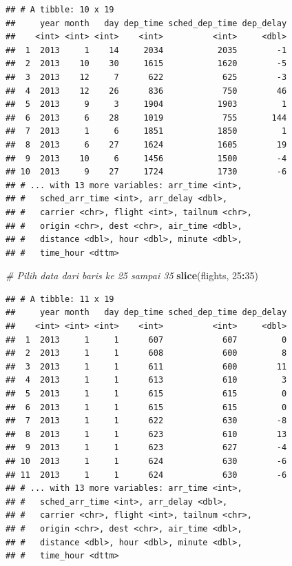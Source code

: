 \documentclass[]{book}
\newenvironment{Shaded}{\begin{snugshade}}{\end{snugshade}}
\newcommand{\KeywordTok}[1]{\textcolor[rgb]{0.13,0.29,0.53}{\textbf{#1}}}
\newcommand{\DecValTok}[1]{\textcolor[rgb]{0.00,0.00,0.81}{#1}}
\newcommand{\CommentTok}[1]{\textcolor[rgb]{0.56,0.35,0.01}{\textit{#1}}}
\newcommand{\OperatorTok}[1]{\textcolor[rgb]{0.81,0.36,0.00}{\textbf{#1}}}
\newcommand{\NormalTok}[1]{#1}
\begin{document}
\begin{verbatim}
## # A tibble: 10 x 19
##     year month   day dep_time sched_dep_time dep_delay
##    <int> <int> <int>    <int>          <int>     <dbl>
##  1  2013     1    14     2034           2035        -1
##  2  2013    10    30     1615           1620        -5
##  3  2013    12     7      622            625        -3
##  4  2013    12    26      836            750        46
##  5  2013     9     3     1904           1903         1
##  6  2013     6    28     1019            755       144
##  7  2013     1     6     1851           1850         1
##  8  2013     6    27     1624           1605        19
##  9  2013    10     6     1456           1500        -4
## 10  2013     9    27     1724           1730        -6
## # ... with 13 more variables: arr_time <int>,
## #   sched_arr_time <int>, arr_delay <dbl>,
## #   carrier <chr>, flight <int>, tailnum <chr>,
## #   origin <chr>, dest <chr>, air_time <dbl>,
## #   distance <dbl>, hour <dbl>, minute <dbl>,
## #   time_hour <dttm>
\end{verbatim}

\begin{Shaded}
\begin{Highlighting}[]
\CommentTok{# Pilih data dari baris ke 25 sampai 35}
\KeywordTok{slice}\NormalTok{(flights, }\DecValTok{25}\OperatorTok{:}\DecValTok{35}\NormalTok{)}
\end{Highlighting}
\end{Shaded}

\begin{verbatim}
## # A tibble: 11 x 19
##     year month   day dep_time sched_dep_time dep_delay
##    <int> <int> <int>    <int>          <int>     <dbl>
##  1  2013     1     1      607            607         0
##  2  2013     1     1      608            600         8
##  3  2013     1     1      611            600        11
##  4  2013     1     1      613            610         3
##  5  2013     1     1      615            615         0
##  6  2013     1     1      615            615         0
##  7  2013     1     1      622            630        -8
##  8  2013     1     1      623            610        13
##  9  2013     1     1      623            627        -4
## 10  2013     1     1      624            630        -6
## 11  2013     1     1      624            630        -6
## # ... with 13 more variables: arr_time <int>,
## #   sched_arr_time <int>, arr_delay <dbl>,
## #   carrier <chr>, flight <int>, tailnum <chr>,
## #   origin <chr>, dest <chr>, air_time <dbl>,
## #   distance <dbl>, hour <dbl>, minute <dbl>,
## #   time_hour <dttm>
\end{verbatim}
\end{document}

